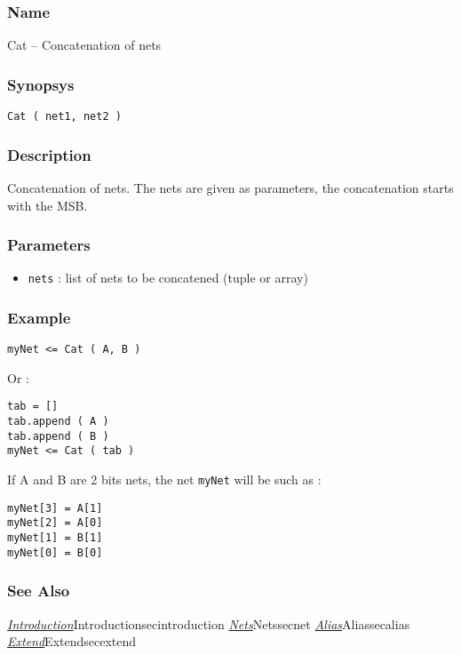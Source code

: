 \subsubsection{Name}

Cat -- Concatenation of nets

\subsubsection{Synopsys}

\begin{verbatim}
Cat ( net1, net2 )
\end{verbatim}

\subsubsection{Description}

Concatenation of nets. The nets are given as parameters, the concatenation starts with the MSB.

\subsubsection{Parameters}

\begin{itemize}
    \item \verb-nets- : list of nets to be concatened (tuple or array)
\end{itemize}

\subsubsection{Example}

\begin{verbatim}
myNet <= Cat ( A, B )
\end{verbatim}
\indent Or :
\begin{verbatim}
tab = []
tab.append ( A )
tab.append ( B )
myNet <= Cat ( tab )
\end{verbatim}

\indent If A and B are 2 bits nets, the net \verb-myNet- will be such as :
\begin{verbatim}
myNet[3] = A[1]
myNet[2] = A[0]
myNet[1] = B[1]
myNet[0] = B[0]
\end{verbatim}

\subsubsection{See Also}

\hyperref[ref]{\emph{Introduction}}{}{Introduction}{secintroduction}
\hyperref[ref]{\emph{Nets}}{}{Nets}{secnet}
\hyperref[ref]{\emph{Alias}}{}{Alias}{secalias}
\hyperref[ref]{\emph{Extend}}{}{Extend}{secextend}
